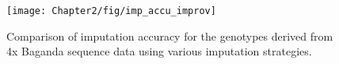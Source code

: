 \begin{figure}[htp]
\centering
\texttt{[image: Chapter2/fig/imp\_accu\_improv]}
\caption{Comparison of imputation accuracy for the genotypes derived from 4x Baganda sequence data using various imputation strategies.}
\label{fig:imp_accu_improv}
\end{figure}